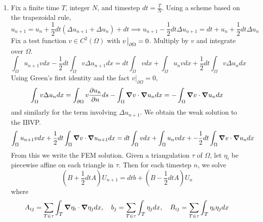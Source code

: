 \documentclass{article}
\newcommand{\imp}{\implies}
\newcommand{\ptl}{\partial}
\begin{document}
\begin{enumerate}[label=(\alph*)]
	
\item Fix a finite time $T$, integer $N$, and timestep $dt=\frac TN$. Using a scheme based on the trapezoidal rule,
$$u_{n+1} = u_n + \frac12dt(\Delta u_{n+1}+\Delta u_n) + dt
\imp u_{n+1} - \frac12dt\Delta u_{n+1} = dt + u_n + \frac12dt\Delta u_n$$
Fix a test function $v\in C^2(\Omega)$ with $v\eval_{\ptl\Omega}=0$. Multiply by $v$ and integrate over $\Omega$.
$$\int_\Omega u_{n+1}vdx - \frac12dt\int_\Omega v\Delta u_{n+1}dx = dt\int_\Omega vdx + \int_\Omega u_nvdx + \frac12dt\int_\Omega v\Delta u_ndx$$
Using Green's first identity and the fact $v|_{\ptl\Omega}=0$,
$$\int_\Omega v\Delta u_ndx = \int_{\ptl\Omega}v\pdv{u_n}{n}ds - \int_\Omega\grad v\cdot\grad u_ndx
= -\int_\Omega\grad v\cdot\grad u_ndx$$
and similarly for the term involving $\Delta u_{n+1}$. We obtain the weak solution to the IBVP.
$$\int_\Omega u_{n+1}vdx + \frac12dt\int_\Omega\grad v\cdot\grad u_{n+1}dx = dt\int_\Omega vdx + \int_\Omega u_nvdx + -\frac12dt\int_\Omega\grad v\cdot\grad u_ndx$$
From this we write the FEM solution. Given a triangulation $\tau$ of $\Omega$, let $\eta_i$ be piecewise affine on each triangle in $\tau$. Then for each timestep $n$, we solve 
$$(B+\frac12dtA)U_{n+1} = dtb + (B-\frac12dtA)U_n$$
where
$$A_{ij} = \sum_{T\in\tau}\int_T\grad\eta_i\cdot\grad\eta_jdx,
\quad b_j = \sum_{T\in\tau}\int_T\eta_jdx,
\quad B_{ij} = \sum_{T\in\tau}\int_T\eta_i\eta_jdx$$
	
\end{enumerate}


	
\end{document}
